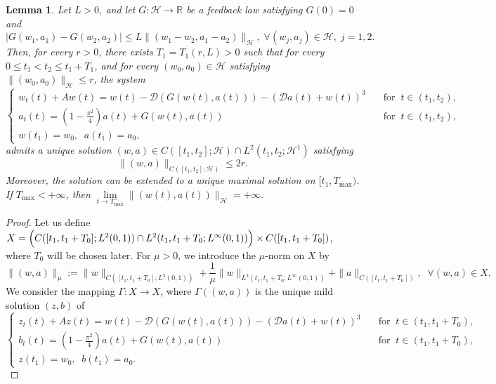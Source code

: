\documentclass[a4paper]{article}
\newtheorem{lemma}[theorem]{Lemma}
\numberwithin{equation}{section}
\begin{document}
\begin{appendices}
\begin{lemma}\label{w2}
Let $L>0$, and let $G:\mathcal{H}\to\mathbb{R}$ be a feedback law satisfying $G(0)=0$ and
$$|G(w_1,a_1)-G(w_2,a_2)|\le L\|(w_1-w_2,a_1-a_2)\|_{\mathcal{H}},\;\forall (w_j,a_j)\in \mathcal{H},\;j=1,2.$$
Then, for every $r>0$, there exists $T_1=T_1\left(r,L\right)>0$ such that for every $0\le t_1<t_2\le t_1+T_1$, and for every $(w_0,a_0)\in \mathcal{H}$ satisfying $\|(w_0,a_0)\|_{\mathcal H}\le r$, the system
\begin{equation}\label{we1}
\left\{\begin{array}{ll}
    w_t(t)+Aw(t)=w(t)-\mathcal{D}(G(w(t),a(t)))-(\mathcal{D}a(t)+w(t))^3\quad&\text{for}\;\;t\in (t_1,t_2),\\
    a_t(t)=(1-\frac{\pi^2}{4})a(t)+G(w(t),a(t))\quad&\text{for}\;\;t\in (t_1,t_2),\\
    w(t_1)=w_0,\;\;a(t_1)=a_0,
\end{array}\right.
\end{equation}
admits a unique solution $(w,a)\in C([t_1,t_2];\mathcal H)\cap L^2(t_1,t_2;\mathcal H^1)$ satisfying
\begin{equation}\label{es1}
\|(w,a)\|_{C([t_1,t_2];\mathcal{H})}\le 2r.
\end{equation}
Moreover, the solution can be extended to a unique maximal solution on
$[t_1,T_{\max})$. If $T_{\max}<+\infty$, then $\lim\limits_{t\to T_{\max}^-}\|(w(t),a(t))\|_{\mathcal H}=+\infty.$
\end{lemma}
\begin{proof}    
Let us define $X=\Bigl(C([t_1,t_1+T_0];L^2(0,1))\cap L^2(t_1,t_1+T_0;L^{\infty}(0,1))\Bigr)\times  C([t_1,t_1+T_0])$, where $T_0$ will be chosen later. For $\mu>0$, we introduce the ${\mu}$-norm on $X$ by
$$\|(w,a)\|_{{\mu}}:=\|w\|_{C([t_1,t_1+T_0];L^2(0,1))}+\frac{1}{\mu}\|w\|_{L^2(t_1,t_1+T_0;L^{\infty}(0,1))}+\|a\|_{ C([t_1,t_1+T_0])},\;\;\forall (w,a)\in X.$$
We consider the mapping $\Gamma:X\to X$, where $\Gamma((w,a))$ is the unique mild solution $(z,b)$ of
\begin{equation}\label{fix1}
\left\{\begin{array}{ll}
    z_t(t)+Az(t)=w(t)-\mathcal{D}(G(w(t),a(t)))-(\mathcal{D}a(t)+w(t))^3\quad&\text{for}\;\;t\in (t_1,t_1+T_0),\\
    b_t(t)=(1-\frac{\pi^2}{4})a(t)+G(w(t),a(t))\quad&\text{for}\;\;t\in (t_1,t_1+T_0),\\
    z(t_1)=w_0,\;\;b(t_1)=a_0.
\end{array}\right.
\end{equation}
    

\end{proof}
\end{appendices}
\end{document}
